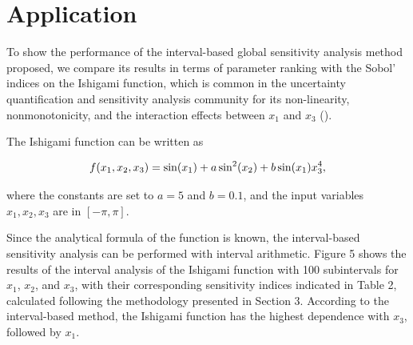 \documentclass[twocolumn]{rps-esrel2022}
\begin{document}

\section{Application}

To show the performance of the interval-based global sensitivity analysis method proposed, we compare
its results in terms of parameter ranking with the Sobol' indices on the Ishigami function, which is common in the uncertainty quantification
and sensitivity analysis community for its non-linearity, nonmonotonicity, and the interaction effects between $x_1$ and $x_3$ (\cite{ishigami1990importance}).

The Ishigami function can be written as

\begin{equation}
	\centering
	f(x_1,x_2,x_3) = \sin(x_1) + a\sin^2(x_2) + b\sin(x_1)x_3^4{,}
\end{equation}

where the constants are set to $a=5$ and $b=0.1$, and the input variables $x_1,x_2,x_3$ are in $[-\pi,\pi]$.

Since the analytical formula of the function is known, the interval-based sensitivity analysis can be performed with interval
arithmetic.
Figure 5 shows the results of the interval analysis of the Ishigami function with 100 subintervals for $x_1$, $x_2$, and $x_3$, with their corresponding sensitivity
indices indicated in Table 2, calculated following the methodology presented in Section 3.
According to the interval-based method, the Ishigami function has the highest dependence with $x_3$, followed by $x_1$.
\end{document}
